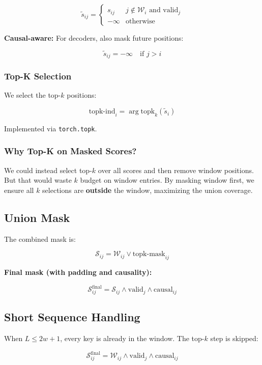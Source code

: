 \[
\tilde{s}_{ij} = \begin{cases} s_{ij} & j \notin \mathcal{W}_i \text{ and valid}_j \\ -\infty & \text{otherwise} \end{cases}
\tag{4.3}
\]

\textbf{Causal-aware:} For decoders, also mask future positions:

\[
\tilde{s}_{ij} = -\infty \quad \text{if } j > i
\tag{4.4}
\]

\subsubsection{Top-K Selection}

We select the top-$k$ positions:

\[
\text{topk-ind}_i = \arg\text{topk}_{k}(\tilde{s}_i)
\tag{4.5}
\]

Implemented via \texttt{torch.topk}.

\subsubsection{Why Top-K on Masked Scores?}

We could instead select top-$k$ over all scores and then remove window 
positions. But that would waste $k$ budget on window entries. By masking 
window first, we ensure all $k$ selections are \textbf{outside} the window, 
maximizing the union coverage.

\subsection{Union Mask}

The combined mask is:

\[
\mathcal{S}_{ij} = \mathcal{W}_{ij} \lor \text{topk-mask}_{ij}
\tag{4.6}
\]

\textbf{Final mask (with padding and causality):}

\[
\mathcal{S}_{ij}^\text{final} = \mathcal{S}_{ij} \land \text{valid}_j \land \text{causal}_{ij}
\tag{4.7}
\]

\subsection{Short Sequence Handling}

When $L \leq 2w + 1$, every key is already in the window. The top-$k$ step 
is skipped:

\[
\mathcal{S}_{ij}^\text{final} = \mathcal{W}_{ij} \land \text{valid}_j \land \text{causal}_{ij}
\tag{4.8}
\]

